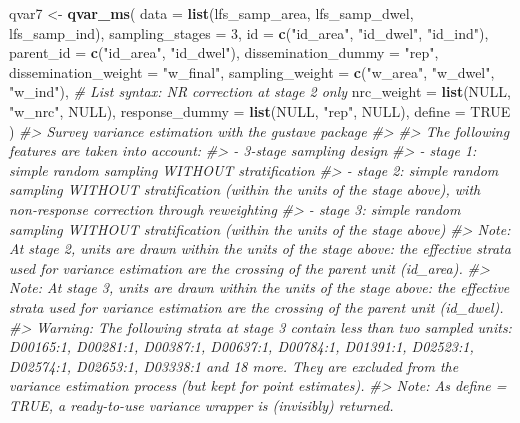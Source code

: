 \documentclass[
]{article}
\newenvironment{Shaded}{\begin{snugshade}}{\end{snugshade}}
\newcommand{\AttributeTok}[1]{\textcolor[rgb]{0.13,0.29,0.53}{#1}}
\newcommand{\CommentTok}[1]{\textcolor[rgb]{0.56,0.35,0.01}{\textit{#1}}}
\newcommand{\ConstantTok}[1]{\textcolor[rgb]{0.56,0.35,0.01}{#1}}
\newcommand{\DecValTok}[1]{\textcolor[rgb]{0.00,0.00,0.81}{#1}}
\newcommand{\FunctionTok}[1]{\textcolor[rgb]{0.13,0.29,0.53}{\textbf{#1}}}
\newcommand{\NormalTok}[1]{#1}
\newcommand{\OtherTok}[1]{\textcolor[rgb]{0.56,0.35,0.01}{#1}}
\newcommand{\StringTok}[1]{\textcolor[rgb]{0.31,0.60,0.02}{#1}}
\begin{document}
\begin{Shaded}
\begin{Highlighting}[]
\NormalTok{qvar7 }\OtherTok{\textless{}{-}} \FunctionTok{qvar\_ms}\NormalTok{(}
  \AttributeTok{data =} \FunctionTok{list}\NormalTok{(lfs\_samp\_area, lfs\_samp\_dwel, lfs\_samp\_ind),}
  \AttributeTok{sampling\_stages =} \DecValTok{3}\NormalTok{,}
  \AttributeTok{id =} \FunctionTok{c}\NormalTok{(}\StringTok{"id\_area"}\NormalTok{, }\StringTok{"id\_dwel"}\NormalTok{, }\StringTok{"id\_ind"}\NormalTok{),}
  \AttributeTok{parent\_id =} \FunctionTok{c}\NormalTok{(}\StringTok{"id\_area"}\NormalTok{, }\StringTok{"id\_dwel"}\NormalTok{),}
  \AttributeTok{dissemination\_dummy =} \StringTok{"rep"}\NormalTok{,}
  \AttributeTok{dissemination\_weight =} \StringTok{"w\_final"}\NormalTok{,}
  \AttributeTok{sampling\_weight =} \FunctionTok{c}\NormalTok{(}\StringTok{"w\_area"}\NormalTok{, }\StringTok{"w\_dwel"}\NormalTok{, }\StringTok{"w\_ind"}\NormalTok{),}
  \CommentTok{\# List syntax: NR correction at stage 2 only}
  \AttributeTok{nrc\_weight =} \FunctionTok{list}\NormalTok{(}\ConstantTok{NULL}\NormalTok{, }\StringTok{"w\_nrc"}\NormalTok{, }\ConstantTok{NULL}\NormalTok{),}
  \AttributeTok{response\_dummy =} \FunctionTok{list}\NormalTok{(}\ConstantTok{NULL}\NormalTok{, }\StringTok{"rep"}\NormalTok{, }\ConstantTok{NULL}\NormalTok{),}
  \AttributeTok{define =} \ConstantTok{TRUE}
\NormalTok{)}
\CommentTok{\#\textgreater{} Survey variance estimation with the gustave package}
\CommentTok{\#\textgreater{} }
\CommentTok{\#\textgreater{} The following features are taken into account:}
\CommentTok{\#\textgreater{}   {-} 3{-}stage sampling design}
\CommentTok{\#\textgreater{}   {-} stage 1: simple random sampling WITHOUT stratification}
\CommentTok{\#\textgreater{}   {-} stage 2: simple random sampling WITHOUT stratification (within the units of the stage above), with non{-}response correction through reweighting}
\CommentTok{\#\textgreater{}   {-} stage 3: simple random sampling WITHOUT stratification (within the units of the stage above)}
\CommentTok{\#\textgreater{} Note: At stage 2, units are drawn within the units of the stage above: the effective strata used for variance estimation are the crossing of the parent unit (id\_area).}
\CommentTok{\#\textgreater{} Note: At stage 3, units are drawn within the units of the stage above: the effective strata used for variance estimation are the crossing of the parent unit (id\_dwel).}
\CommentTok{\#\textgreater{} Warning: The following strata at stage 3 contain less than two sampled units: D00165:1, D00281:1, D00387:1, D00637:1, D00784:1, D01391:1, D02523:1, D02574:1, D02653:1, D03338:1 and 18 more. They are excluded from the variance estimation process (but kept for point estimates).}
\CommentTok{\#\textgreater{} Note: As define = TRUE, a ready{-}to{-}use variance wrapper is (invisibly) returned.}
\end{Highlighting}
\end{Shaded}
\end{document}
